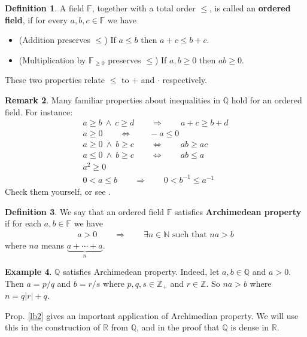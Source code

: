 \documentclass[12pt,b5paper,notitlepage]{article}
\theoremstyle{definition}
\newtheorem{df}{Definition}[section]
\newtheorem{eg}[df]{Example}
\newtheorem{rem}[df]{Remark}
\theoremstyle{plain}
\newcommand{\Nbb}{\mathbb N}
\newcommand{\Zbb}{\mathbb Z}
\newcommand{\Qbb}{\mathbb Q}
\newcommand{\Rbb}{\mathbb R}
\newcommand{\Fbb}{\mathbb F}
\numberwithin{equation}{section}
\begin{document}
\begin{df}
A field $\Fbb$, together with a total order $\leq$, is called an  \textbf{ordered field}, if for every $a,b,c\in\Fbb$ we have
\begin{itemize}
\item (Addition preserves $\leq$) If $a\leq b$ then $a+c\leq b+c$.
\item (Multiplication by $\Fbb_{\geq0}$ preserves $\leq$) If $a,b\geq 0$ then $ab\geq0$.
\end{itemize}
These two properties relate $\leq$ to $+$ and $\cdot$ respectively.
\end{df}

\begin{rem}
Many familiar properties about inequalities in $\Qbb$ hold for an ordered field. For instance: 
\begin{gather*}
a\geq b~\wedge~ c\geq d \qquad\Longrightarrow\qquad a+c\geq b+d\\
a\geq0\qquad\Longleftrightarrow\qquad -a\leq0\\
a\geq0~\wedge~b\geq c\qquad\Longleftrightarrow\qquad ab\geq ac\\
a\leq0~\wedge~b\geq c\qquad\Longleftrightarrow\qquad ab\leq a\\
a^2\geq0\\
0<a\leq b\qquad\Longrightarrow\qquad 0< b^{-1}\leq a^{-1}
\end{gather*}
Check them yourself, or see \cite[Prop. 1.18]{Rud-P}.
\end{rem}


\begin{df}
We say that an ordered field $\Fbb$ satisfies  \textbf{Archimedean property} if for each $a,b\in\Fbb$ we have
\begin{align*}
a> 0\qquad\Longrightarrow \qquad\exists n\in\Nbb\text{ such that }na>b
\end{align*}
where $na$ means $\underbrace{a+\cdots+a}_{n}$.
\end{df}

\begin{eg}
$\Qbb$ satisfies Archimedean property. Indeed, let $a,b\in\Qbb$ and $a>0$. Then $a=p/q$ and $b=r/s$ where $p,q,s\in\Zbb_+$ and $r\in\Zbb$. So $na>b$ where $n=q|r|+q$.
\end{eg}



Prop. \ref{lb2} gives an important application of Archimedian property. We will use this in the construction of $\Rbb$ from $\Qbb$, and in the proof that $\Qbb$ is dense in $\Rbb$. 
\end{document}
